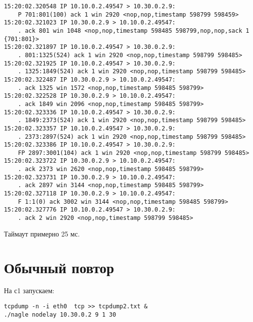 \documentclass[a4paper,12pt]{article}
\begin{document}
\begin{Verbatim}
15:20:02.320548 IP 10.10.0.2.49547 > 10.30.0.2.9: 
    P 701:801(100) ack 1 win 2920 <nop,nop,timestamp 598799 598459>
15:20:02.321023 IP 10.30.0.2.9 > 10.10.0.2.49547: 
    . ack 801 win 1048 <nop,nop,timestamp 598485 598799,nop,nop,sack 1 {701:801}>
15:20:02.321897 IP 10.10.0.2.49547 > 10.30.0.2.9: 
    . 801:1325(524) ack 1 win 2920 <nop,nop,timestamp 598799 598485>
15:20:02.321925 IP 10.10.0.2.49547 > 10.30.0.2.9: 
    . 1325:1849(524) ack 1 win 2920 <nop,nop,timestamp 598799 598485>
15:20:02.322487 IP 10.30.0.2.9 > 10.10.0.2.49547: 
    . ack 1325 win 1572 <nop,nop,timestamp 598485 598799>
15:20:02.322528 IP 10.30.0.2.9 > 10.10.0.2.49547: 
    . ack 1849 win 2096 <nop,nop,timestamp 598485 598799>
15:20:02.323336 IP 10.10.0.2.49547 > 10.30.0.2.9: 
    . 1849:2373(524) ack 1 win 2920 <nop,nop,timestamp 598799 598485>
15:20:02.323357 IP 10.10.0.2.49547 > 10.30.0.2.9: 
    . 2373:2897(524) ack 1 win 2920 <nop,nop,timestamp 598799 598485>
15:20:02.323386 IP 10.10.0.2.49547 > 10.30.0.2.9: 
    FP 2897:3001(104) ack 1 win 2920 <nop,nop,timestamp 598799 598485>
15:20:02.323722 IP 10.30.0.2.9 > 10.10.0.2.49547: 
    . ack 2373 win 2620 <nop,nop,timestamp 598485 598799>
15:20:02.323731 IP 10.30.0.2.9 > 10.10.0.2.49547: 
    . ack 2897 win 3144 <nop,nop,timestamp 598485 598799>
15:20:02.327118 IP 10.30.0.2.9 > 10.10.0.2.49547: 
    F 1:1(0) ack 3002 win 3144 <nop,nop,timestamp 598485 598799>
15:20:02.327776 IP 10.10.0.2.49547 > 10.30.0.2.9: 
    . ack 2 win 2920 <nop,nop,timestamp 598799 598485>
\end{Verbatim}

Таймаут примерно 25 мс.

\section{Обычный повтор}

На с1 запускаем:
\begin{Verbatim}
tcpdump -n -i eth0  tcp >> tcpdump2.txt &
./nagle nodelay 10.30.0.2 9 1 30
\end{Verbatim}
\end{document}
